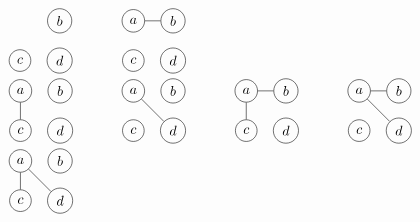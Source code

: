 \documentclass[12pt, A4]{article}
\begin{document}
\begin{enumerate}
\[\begin{tabular}{*{4}{p{0.2\textwidth}}}
\begin{tikzpicture}
								\node[circle, draw] (b) at (1, 1) {\(b\)};
								\node[circle, draw] (c) at (0, 0) {\(c\)};
								\node[circle, draw] (d) at (1, 0) {\(d\)};
							\end{tikzpicture}
						&
							\begin{tikzpicture}
								\node[circle, draw] (a) at (0, 1) {\(a\)};
								\node[circle, draw] (b) at (1, 1) {\(b\)};
								\node[circle, draw] (c) at (0, 0) {\(c\)};
								\node[circle, draw] (d) at (1, 0) {\(d\)};
								\draw (a) to (b);
							\end{tikzpicture}
						\\
							\begin{tikzpicture}
								\node[circle, draw] (a) at (0, 1) {\(a\)};
								\node[circle, draw] (b) at (1, 1) {\(b\)};
								\node[circle, draw] (c) at (0, 0) {\(c\)};
								\node[circle, draw] (d) at (1, 0) {\(d\)};
								\draw (a) to (c);
							\end{tikzpicture}
						&
							\begin{tikzpicture}
								\node[circle, draw] (a) at (0, 1) {\(a\)};
								\node[circle, draw] (b) at (1, 1) {\(b\)};
								\node[circle, draw] (c) at (0, 0) {\(c\)};
								\node[circle, draw] (d) at (1, 0) {\(d\)};
								\draw (a) to (d);
							\end{tikzpicture}
						&
							\begin{tikzpicture}
								\node[circle, draw] (a) at (0, 1) {\(a\)};
								\node[circle, draw] (b) at (1, 1) {\(b\)};
								\node[circle, draw] (c) at (0, 0) {\(c\)};
								\node[circle, draw] (d) at (1, 0) {\(d\)};
								\draw (a) to (b);
								\draw (a) to (c);
							\end{tikzpicture}
						&
							\begin{tikzpicture}
								\node[circle, draw] (a) at (0, 1) {\(a\)};
								\node[circle, draw] (b) at (1, 1) {\(b\)};
								\node[circle, draw] (c) at (0, 0) {\(c\)};
								\node[circle, draw] (d) at (1, 0) {\(d\)};
								\draw (a) to (b);
								\draw (a) to (d);
							\end{tikzpicture}
						\\
							\begin{tikzpicture}
								\node[circle, draw] (a) at (0, 1) {\(a\)};
								\node[circle, draw] (b) at (1, 1) {\(b\)};
								\node[circle, draw] (c) at (0, 0) {\(c\)};
								\node[circle, draw] (d) at (1, 0) {\(d\)};
								\draw (a) to (c);
								\draw (a) to (d);
							\end{tikzpicture}
						&

\end{tabular}\]
\end{enumerate}
\end{document}
